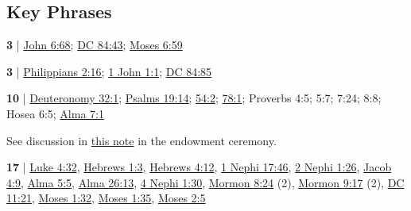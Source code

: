 \subsection{Key Phrases} %
	\label{WORD-PHRASES}

	\begin{compactdesc}
	
		\item[word(s) of eternal life] \textbf{3} | \hyperref[JOHN-6-68]{John 6:68}; \hyperref[DC84-43]{DC 84:43}; \hyperref[MOSES-6-59]{Moses 6:59} %
	
		\item[word(s) of life] \textbf{3} | \hyperref[PHILIPPIANS-2-16]{Philippians 2:16}; \hyperref[1JOHN-1-1]{1 John 1:1}; \hyperref[DC84-85]{DC 84:85} %
	
		\item[words of my mouth] \textbf{10} | \hyperref[DEUTERONOMY-32-1]{Deuteronomy 32:1}; \hyperref[PSALMS-19-14]{Psalms 19:14}; \hyperref[PSALMS-54-2]{54:2}; \hyperref[PSALMS-78-1]{78:1}; Proverbs 4:5; 5:7; 7:24; 8:8; Hosea 6:5; \hyperref[ALMA-7-1]{Alma 7:1}
			\begin{compactdesc}
				\item[Commentary] See discussion in \hyperref[ENDOWMENT-words-mouth]{this note} in the endowment ceremony.
			\end{compactdesc}
			
		\item[word of my power/power of my word] \textbf{17} | \hyperref[LUKE-4-32]{Luke 4:32}, \hyperref[HEBREWS-1-3]{Hebrews 1:3}, \hyperref[HEBREWS-4-12]{Hebrews 4:12}, \hyperref[1NEPHI-17-46]{1 Nephi 17:46}, \hyperref[2NEPHI-1-26]{2 Nephi 1:26}, \hyperref[JACOB-4-9]{Jacob 4:9}, \hyperref[ALMA-5-5]{Alma 5:5}, \hyperref[ALMA-26-13]{Alma 26:13}, \hyperref[4NEPHI-1-30]{4 Nephi 1:30}, \hyperref[MORMON-8-24]{Mormon 8:24} (2), \hyperref[MORMON-9-17]{Mormon 9:17} (2), \hyperref[DC11-21]{DC 11:21}, \hyperref[MOSES-1-32]{Moses 1:32}, \hyperref[MOSES-1-35]{Moses 1:35}, \hyperref[MOSES-2-5]{Moses 2:5}
			
	\end{compactdesc}
	
